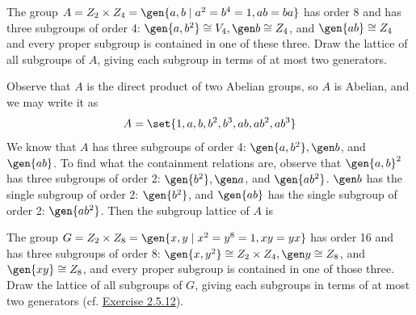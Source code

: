 \begin{exercise} \label{ex2.5.12} 
    The group $A = Z_2 \times Z_4 = \gen{a, b \mid a^2 = b^4 = 1, ab = ba}$ has order 8 and has three subgroups of order 4: $\gen{a, b^2} \cong V_4, \gen b \cong Z_4$, and $\gen{ab} \cong Z_4$ and every proper subgroup is contained in one of these three. Draw the lattice of all subgroups of $A$, giving each subgroup in terms of at most two generators.
\end{exercise}

\begin{sol}
    Observe that $A$ is the direct product of two Abelian groups, so $A$ is Abelian, and we may write it as
    \[A = \set{1, a, b, b^2, b^3, ab, ab^2, ab^3}\]
    We know that $A$ has three subgroups of order 4: $\gen{a, b^2}, \gen b$, and $\gen{ab}$. To find what the containment relations are, observe that $\gen{a, b}^2$ has three subgroups of order 2: $\gen{b^2}, \gen a$, and $\gen{ab^2}$. $\gen b$ has the single subgroup of order 2: $\gen{b^2}$, and $\gen{ab}$ has the single subgroup of order 2: $\gen{ab^2}$. Then the subgroup lattice of $A$ is
    \begin{center}
    \end{center}
\end{sol}

\begin{exercise} \label{ex2.5.13}
    The group $G = Z_2 \times Z_8 = \gen{x, y \mid x^2 = y^8 = 1, xy = yx}$ has order 16 and has three subgroups of order 8: $\gen{x, y^2} \cong Z_2 \times Z_4, \gen y \cong Z_8$, and $\gen{xy} \cong Z_8$, and every proper subgroup is contained in one of those three. Draw the lattice of all subgroups of $G$, giving each subgroups in terms of at most two generators (cf. \hyperref[ex2.5.12]{Exercise 2.5.12}).
\end{exercise}

